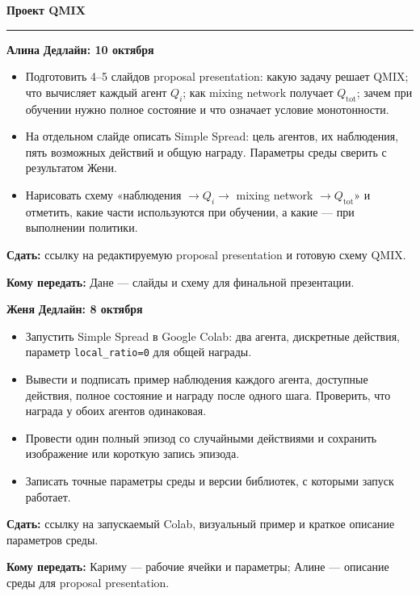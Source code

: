 \documentclass[11pt,a4paper]{article}
\newcommand{\person}[2]{%
  \Needspace{12\baselineskip}
  \vspace{5pt}
  \noindent\colorbox{pale}{\parbox{\dimexpr\linewidth-2\fboxsep\relax}{%
    \hspace*{7pt}\rule{0pt}{25pt}{\Large\bfseries\color{navy}#1}%
    \hfill{\bfseries\color{deadline}Дедлайн: #2}\hspace*{7pt}}}\par
  \vspace{1pt}
}
\begin{document}
\thispagestyle{firstpage}
{\Huge\bfseries\color{navy}Проект QMIX}\par
\vspace{3pt}
{\color{teal}\rule{44mm}{2.2pt}}\par
\vspace{3pt}

\person{Алина}{10 октября}
\begin{itemize}
  \item Подготовить 4--5 слайдов proposal presentation: какую задачу решает QMIX; что вычисляет каждый агент $Q_i$; как mixing network получает $Q_{\mathrm{tot}}$; зачем при обучении нужно полное состояние и что означает условие монотонности.
  \item На отдельном слайде описать Simple Spread: цель агентов, их наблюдения, пять возможных действий и общую награду. Параметры среды сверить с результатом Жени.
  \item Нарисовать схему «наблюдения $\rightarrow Q_i \rightarrow$ mixing network $\rightarrow Q_{\mathrm{tot}}$» и отметить, какие части используются при обучении, а какие — при выполнении политики.
\end{itemize}
\textbf{Сдать:} ссылку на редактируемую proposal presentation и готовую схему QMIX.\par
\textbf{Кому передать:} Дане — слайды и схему для финальной презентации.\par

\person{Женя}{8 октября}
\begin{itemize}
  \item Запустить Simple Spread в Google Colab: два агента, дискретные действия, параметр \texttt{local\_ratio=0} для общей награды.
  \item Вывести и подписать пример наблюдения каждого агента, доступные действия, полное состояние и награду после одного шага. Проверить, что награда у обоих агентов одинаковая.
  \item Провести один полный эпизод со случайными действиями и сохранить изображение или короткую запись эпизода.
  \item Записать точные параметры среды и версии библиотек, с которыми запуск работает.
\end{itemize}
\textbf{Сдать:} ссылку на запускаемый Colab, визуальный пример и краткое описание параметров среды.\par
\textbf{Кому передать:} Кариму — рабочие ячейки и параметры; Алине — описание среды для proposal presentation.\par
\end{document}
